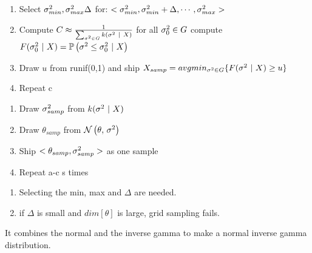 \documentclass[12pt]{article}
\begin{document}
\begin{enumerate}


\begin{enumerate}
    \item Select $\sigma^2_{min}, \sigma^2_{max} \Delta$ for: $<\sigma^2_{min}, \sigma^2_{min} + \Delta, \cdots, \sigma^2_{max}>$ 
    \item Compute $C \approx \frac{1}{\sum_{\sigma^2 \in G} k(\sigma^2~|~X)}$ for all $\sigma^2_0 \in G$ compute $F(\sigma^2_0~|~X) = \mathbb{P}\left(\sigma^2 \leq \sigma^2_0~|~X\right)$
    \item Draw $u$ from runif(0,1) and ship $X_{samp} = avgmin_{\sigma^2 \in G} \{ F(\sigma^2~|~X) \geq u \}$
    \item Repeat c
\end{enumerate}


 
\begin{enumerate}
    \item Draw $\sigma^2_{samp}$ from $k(\sigma^2~|~X)$
    \item Draw $\theta_{samp}$ from $\mathcal{N}\left(\theta,\,\sigma^2\right)$
    \item Ship $<\theta_{samp}, \sigma^2_{samp}>$ as one sample
    \item Repeat a-c s times
\end{enumerate}



\begin{enumerate}
    \item Selecting the min, max and $\Delta$ are needed.
    \item if $\Delta$ is small and $dim[\theta]$ is large, grid sampling fails.
\end{enumerate}


It combines the normal and the inverse gamma to make a normal inverse gamma distribution.


\end{enumerate}
\end{document}
